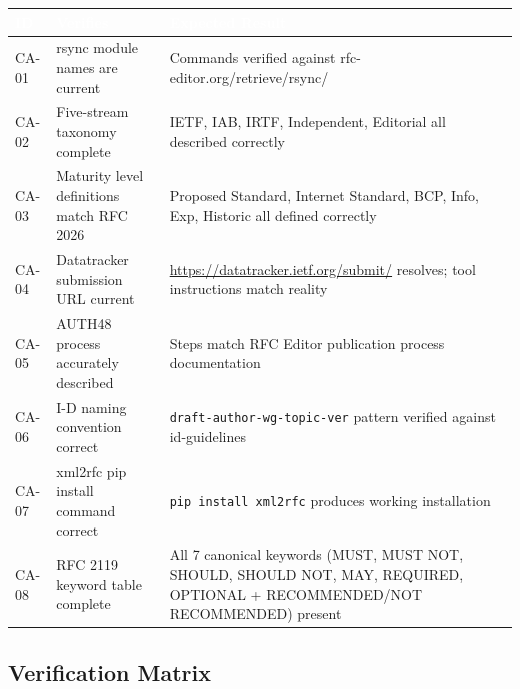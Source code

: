 \documentclass[11pt,letterpaper]{article}
\newcommand{\tableheader}[1]{\textbf{\sffamily\textcolor{white}{#1}}}
\begin{document}
\begin{center}
\begin{tabularx}{\textwidth}{L{1.5cm}L{4cm}X}
\toprule
{}
\tableheader{ID} & \tableheader{Verifies} & \tableheader{Expected Result} \\
\midrule
CA-01 & rsync module names are current & Commands verified against rfc-editor.org/retrieve/rsync/ \\
CA-02 & Five-stream taxonomy complete & IETF, IAB, IRTF, Independent, Editorial all described correctly \\
CA-03 & Maturity level definitions match RFC 2026 & Proposed Standard, Internet Standard, BCP, Info, Exp, Historic all defined correctly \\
CA-04 & Datatracker submission URL current & \url{https://datatracker.ietf.org/submit/} resolves; tool instructions match reality \\
CA-05 & AUTH48 process accurately described & Steps match RFC Editor publication process documentation \\
CA-06 & I-D naming convention correct & \texttt{draft-{author}-{wg}-{topic}-{ver}} pattern verified against id-guidelines \\
CA-07 & xml2rfc pip install command correct & \texttt{pip install xml2rfc} produces working installation \\
CA-08 & RFC 2119 keyword table complete & All 7 canonical keywords (MUST, MUST NOT, SHOULD, SHOULD NOT, MAY, REQUIRED, OPTIONAL + RECOMMENDED/NOT RECOMMENDED) present \\
\bottomrule
\end{tabularx}
\end{center}

\subsection{Verification Matrix}
\end{document}
